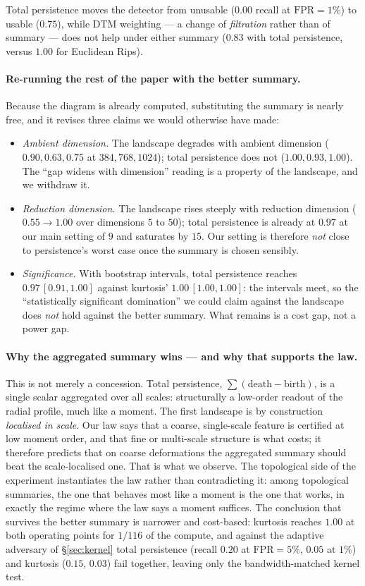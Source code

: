 \documentclass[11pt]{article}
\theoremstyle{remark}
\begin{document}
Total persistence moves the detector from unusable ($0.00$ recall at $\mathrm{FPR}=1\%$) to
usable ($0.75$), while DTM weighting --- a change of \emph{filtration} rather than of summary ---
does not help under either summary ($0.83$ with total persistence, versus $1.00$ for Euclidean
Rips).

\paragraph{Re-running the rest of the paper with the better summary.} Because the diagram is
already computed, substituting the summary is nearly free, and it revises three claims we would
otherwise have made:
\begin{itemize}
\item \emph{Ambient dimension.} The landscape degrades with ambient dimension ($0.90,0.63,0.75$ at
$384,768,1024$); total persistence does not ($1.00,0.93,1.00$). The ``gap widens with dimension''
reading is a property of the landscape, and we withdraw it.
\item \emph{Reduction dimension.} The landscape rises steeply with reduction dimension
($0.55\to1.00$ over dimensions $5$ to $50$); total persistence is already at $0.97$ at our main
setting of $9$ and saturates by $15$. Our setting is therefore \emph{not} close to persistence's
worst case once the summary is chosen sensibly.
\item \emph{Significance.} With bootstrap intervals, total persistence reaches
$0.97\,[0.91,1.00]$ against kurtosis' $1.00\,[1.00,1.00]$: the intervals meet, so the
``statistically significant domination'' we could claim against the landscape does \emph{not} hold
against the better summary. What remains is a cost gap, not a power gap.
\end{itemize}

\paragraph{Why the aggregated summary wins --- and why that supports the law.} This is not merely a
concession. Total persistence, $\sum(\text{death}-\text{birth})$, is a single scalar aggregated over
all scales: structurally a low-order readout of the radial profile, much like a moment. The first
landscape is by construction \emph{localised in scale}. Our law says that a coarse, single-scale
feature is certified at low moment order, and that fine or multi-scale structure is what costs;
it therefore predicts that on coarse deformations the aggregated summary should beat the
scale-localised one. That is what we observe. The topological side of the experiment instantiates
the law rather than contradicting it: among topological summaries, the one that behaves most like
a moment is the one that works, in exactly the regime where the law says a moment suffices. The conclusion that
survives the better summary is narrower and cost-based: kurtosis reaches $1.00$ at both operating
points for $1/116$ of the compute, and against the adaptive adversary of \S\ref{sec:kernel} total
persistence (recall $0.20$ at $\mathrm{FPR}=5\%$, $0.05$ at $1\%$) and kurtosis ($0.15$, $0.03$)
fail together, leaving only the
bandwidth-matched kernel test.
\end{document}
